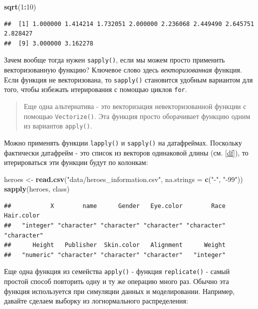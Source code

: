 \documentclass[]{book}
\newenvironment{Shaded}{\begin{snugshade}}{\end{snugshade}}
\newcommand{\KeywordTok}[1]{\textcolor[rgb]{0.13,0.29,0.53}{\textbf{#1}}}
\newcommand{\DataTypeTok}[1]{\textcolor[rgb]{0.13,0.29,0.53}{#1}}
\newcommand{\DecValTok}[1]{\textcolor[rgb]{0.00,0.00,0.81}{#1}}
\newcommand{\StringTok}[1]{\textcolor[rgb]{0.31,0.60,0.02}{#1}}
\newcommand{\OperatorTok}[1]{\textcolor[rgb]{0.81,0.36,0.00}{\textbf{#1}}}
\newcommand{\NormalTok}[1]{#1}
\begin{document}
\begin{Shaded}
\begin{Highlighting}[]
\KeywordTok{sqrt}\NormalTok{(}\DecValTok{1}\OperatorTok{:}\DecValTok{10}\NormalTok{)}
\end{Highlighting}
\end{Shaded}

\begin{verbatim}
##  [1] 1.000000 1.414214 1.732051 2.000000 2.236068 2.449490 2.645751 2.828427
##  [9] 3.000000 3.162278
\end{verbatim}

Зачем вообще тогда нужен \texttt{sapply()}, если мы можем просто
применить векторизованную функцию? Ключевое слово здесь
\emph{векторизованная} функция. Если функция не векторизована, то
\texttt{sapply()} становится удобным вариантом для того, чтобы избежать
итерирования с помощью циклов \texttt{for}.

\begin{quote}
Еще одна альтернатива - это векторизация невекторизованной функции с
помощью \texttt{Vectorize()}. Эта функция просто оборачивает функцию
одним из вариантов \texttt{apply()}.
\end{quote}

Можно применять функции \texttt{lapply()} и \texttt{sapply()} на
датафреймах. Поскольку фактически датафрейм - это список из векторов
одинаковой длины (см. \ref{df}), то итерироваться эти функции будут по
колонкам:

\begin{Shaded}
\begin{Highlighting}[]
\NormalTok{heroes <-}\StringTok{ }\KeywordTok{read.csv}\NormalTok{(}\StringTok{"data/heroes_information.csv"}\NormalTok{, }
                   \DataTypeTok{na.strings =} \KeywordTok{c}\NormalTok{(}\StringTok{"-"}\NormalTok{, }\StringTok{"-99"}\NormalTok{))}
\KeywordTok{sapply}\NormalTok{(heroes, class)}
\end{Highlighting}
\end{Shaded}

\begin{verbatim}
##           X        name      Gender   Eye.color        Race  Hair.color 
##   "integer" "character" "character" "character" "character" "character" 
##      Height   Publisher  Skin.color   Alignment      Weight 
##   "numeric" "character" "character" "character"   "integer"
\end{verbatim}

Еще одна функция из семейства \texttt{apply()} - функция
\texttt{replicate()} - самый простой способ повторить одну и ту же
операцию много раз. Обычно эта функция используется при симуляции данных
и моделировании. Например, давайте сделаем выборку из логнормального
распределения:
\end{document}
